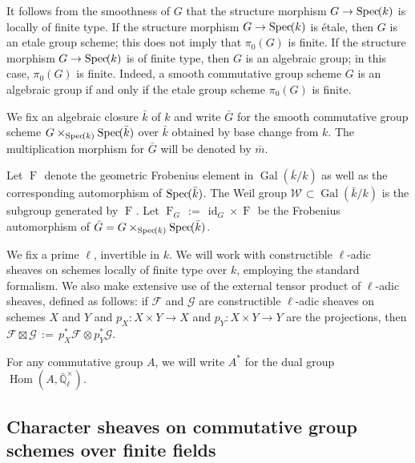 \documentclass[10pt]{amsart}
\theoremstyle{plain}
\theoremstyle{definition}
\theoremstyle{remark}
\newcommand{\EE}{\mathbb{\bar Q}_\ell}
\newcommand{\bFq}{\bar{k}}
\newcommand{\Fq}{k}
\newcommand{\EEx}{\EE^\times}
\newcommand{\Weil}[1]{\mathcal{W}_{#1}}
\DeclareMathOperator{\Gal}{Gal}
\newcommand{\Frob}[1]{\operatorname{F}_{#1}}
\DeclareMathOperator{\Hom}{Hom}
\DeclareMathOperator{\id}{id}
\newcommand{\Spec}[1]{{\operatorname{Spec}\hskip-1pt( #1 )}}
\newcommand{\ceq}{{\, :=\, }}
\newcommand{\bm}{\bar{m}}
\newcommand{\bG}{\bar{G}}
\begin{document}
It follows from the smoothness of $G$ that the structure morphism $G \to \Spec{\Fq}$ is locally of finite type.
If the structure morphism $G \to \Spec{\Fq}$ is \'etale, then $G$ is an etale group scheme; this does not imply that $\pi_0(G)$ is finite.
If the structure morphism $G \to \Spec{\Fq}$ is of finite type, then $G$ is an algebraic group; in this case, $\pi_0(G)$ is finite. 
Indeed, a smooth commutative group scheme $G$ is an algebraic group if and only if the etale group scheme $\pi_0(G)$ is finite.



 
We fix an algebraic closure $\bFq$ of $\Fq$ and write $\bG$ for the
smooth commutative group scheme $G \times_{\Spec{\Fq}} \Spec{\bFq}$ over $\bFq$
obtained by base change from $k$. The multiplication morphism for $\bG$ will be denoted by $\bm$.

Let $\Frob{}$ denote the geometric Frobenius element in $\Gal(\bFq/\Fq)$ as
well as the corresponding automorphism of $\Spec{\bFq}$. The Weil group
$\Weil{}\subset \Gal(\bFq/\Fq)$ is the subgroup generated by $\Frob{}$.
Let $\Frob{G} \ceq \id_{G} \times \Frob{}$ be the Frobenius automorphism of $\bG = G \times_{\Spec{\Fq}} \Spec{\bFq}$.

We fix a prime $\ell$, invertible in $\Fq$.
We will work with constructible $\ell$-adic sheaves 
on schemes locally of finite type over $\Fq$, employing the standard formalism.
We also make extensive use of the external tensor product of $\ell$-adic sheaves,
defined as follows: if $\mathcal{F}$ and $\mathcal{G}$ are constructible $\ell$-adic
sheaves on schemes $X$ and $Y$ and $p_X : X\times Y\to X$ and $p_Y : X\times Y \to Y$
are the projections, then $\mathcal{F}\boxtimes \mathcal{G} \ceq p_X^* \mathcal{F} \otimes p_Y^*\mathcal{G}$.

For any commutative group $A$, we will write $A^*$ for the dual group $\Hom(A, \EEx)$.

\subsection{Character sheaves on commutative group schemes over finite fields}\label{ssec:category}
\end{document}
